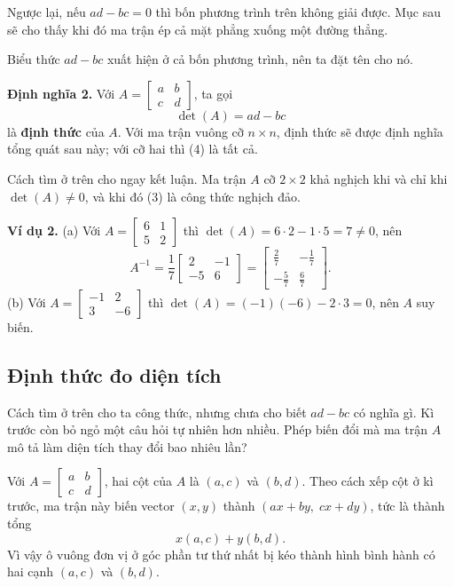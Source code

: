 \documentclass[12pt,a4paper]{article}
\begin{document}
Ngược lại, nếu \(ad-bc=0\) thì bốn phương trình trên không giải được. Mục sau sẽ cho thấy khi đó ma trận ép cả mặt phẳng xuống một đường thẳng.

Biểu thức \(ad-bc\) xuất hiện ở cả bốn phương trình, nên ta đặt tên cho nó.

\textbf{Định nghĩa 2.} Với \(A=\left[ \begin{array}{cc} a & b\\ c & d \end{array} \right]\), ta gọi
$$
\det(A)=ad-bc \tag{4}
$$
là \textbf{định thức} của \(A\). Với ma trận vuông cỡ \(n\times n\), định thức sẽ được định nghĩa tổng quát sau này; với cỡ hai thì (4) là tất cả.

Cách tìm ở trên cho ngay kết luận. Ma trận \(A\) cỡ \(2\times2\) khả nghịch khi và chỉ khi \(\det(A)\neq0\), và khi đó (3) là công thức nghịch đảo.

\textbf{Ví dụ 2.} (a) Với \(A=\left[ \begin{array}{rr} 6 & 1\\ 5 & 2 \end{array} \right]\) thì \(\det(A)=6\cdot2-1\cdot5=7\neq0\), nên
$$
A^{-1}=\frac17\left[ \begin{array}{rr} 2 & -1\\ -5 & 6 \end{array} \right]
=\left[ \begin{array}{rr} \frac27 & -\frac17\\ -\frac57 & \frac67 \end{array} \right].
$$
(b) Với \(A=\left[ \begin{array}{rr} -1 & 2\\ 3 & -6 \end{array} \right]\) thì \(\det(A)=(-1)(-6)-2\cdot3=0\), nên \(A\) suy biến.

\subsection{Định thức đo diện tích}

Cách tìm ở trên cho ta công thức, nhưng chưa cho biết \(ad-bc\) có nghĩa gì. Kì trước còn bỏ ngỏ một câu hỏi tự nhiên hơn nhiều. Phép biến đổi mà ma trận \(A\) mô tả làm diện tích thay đổi bao nhiêu lần?

Với \(A=\left[ \begin{array}{cc} a & b\\ c & d \end{array} \right]\), hai cột của \(A\) là \((a,c)\) và \((b,d)\). Theo cách xếp cột ở kì trước, ma trận này biến vector \((x,y)\) thành \((ax+by,\;cx+dy)\), tức là thành tổng
$$
x(a,c)+y(b,d).
$$
Vì vậy ô vuông đơn vị ở góc phần tư thứ nhất bị kéo thành hình bình hành có hai cạnh \((a,c)\) và \((b,d)\).
\end{document}
